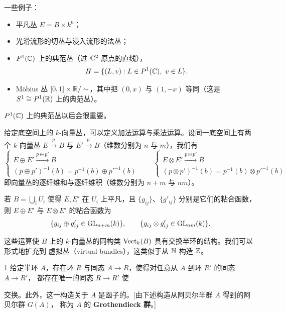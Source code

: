一些例子：
\begin{itemize}[leftmargin=1.6em,itemsep=2pt]
  \item 平凡丛 $E=B\times k^n$；
  \item 光滑流形的切丛与浸入流形的法丛；
  \item $P^1(\mathbb{C})$ 上的典范丛（过 $\mathbb{C}^2$ 原点的直线），
    \[ H=\{(L,v) : L\in P^1(\mathbb{C}),\ v\in L\}. \]
  \item Möbius 丛 $[0,1]\times\mathbb{R}/\sim$，其中把 $(0,x)$ 与 $(1,-x)$ 等同（这是
    $S^1\cong P^1(\mathbb{R})$ 上的典范丛）。
\end{itemize}

$P^1(\mathbb{C})$ 上的典范丛以后会很重要。

给定底空间上的 $k$-向量丛，可以定义加法运算与乘法运算。设同一底空间上有两个 $k$-向量丛
$E\xrightarrow{p}B$ 与 $E'\xrightarrow{p'}B$（维数分别为 $n$ 与 $m$），我们有
\[
\left\{
\begin{array}{l}
E\oplus E'\xrightarrow{p\oplus p'}B\\[2pt]
(p\oplus p')^{-1}(b)=p^{-1}(b)\oplus p'^{-1}(b)
\end{array}
\right.
\qquad
\left\{
\begin{array}{l}
E\otimes E'\xrightarrow{p\otimes p'}B\\[2pt]
(p\otimes p')^{-1}(b)=p^{-1}(b)\otimes p'^{-1}(b)
\end{array}
\right.
\]
即向量丛的逐纤维和与逐纤维积（维数分别为 $n+m$ 与 $nm$）。

若 $B=\bigcup_i U_i$ 使得 $E,E'$ 在 $U_i$ 上平凡，且 $\{g_{ij}\}$、$\{g'_{ij}\}$ 分别是它们的粘合函数，
则 $E\oplus E'$ 与 $E\otimes E'$ 的粘合函数为
\[ \{g_{ij}\oplus g'_{ij}\in\operatorname{GL}_{n+m}(k)\},\qquad \{g_{ij}\otimes g'_{ij}\in\operatorname{GL}_{nm}(k)\}. \]

这些运算使 $B$ 上的 $k$-向量丛的同构类 $\mathrm{Vect}_k(B)$ 具有交换半环的结构。我们可以形式地扩充到
虚拟丛（virtual bundles），这类似于从 $\mathbb{N}$ 构造 $\mathbb{Z}$。

\begin{prop}{1}
  给定半环 $A$，存在环 $R$ 与同态 $A\to R$，使得对任意从 $A$ 到环 $R'$ 的同态 $A\to R'$，
  都存在唯一的同态 $R\to R'$ 使
  \begin{center}
  \end{center}
  交换。此外，这一构造关于 $A$ 是函子的。[由下述构造从阿贝尔半群 $A$ 得到的阿贝尔群 $G(A)$，
  称为 $A$ 的 \textbf{Grothendieck 群}。]
\end{prop}


